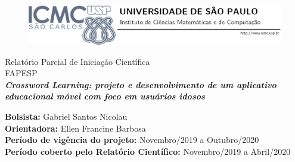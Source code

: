 \begin{titlepage}

\begin{center}
	\begin{figure}[!ht]
	\centering
	\includegraphics[scale=0.5]{Figuras/logo.png}
	\end{figure}
	\vspace{60pt}
	\begin{minipage}[c]{13.5cm}
			\begin{center}
			\vspace{1.3cm} {\Large\sf Relatório Parcial de Iniciação Científica}\\
			\vspace{0.3cm} {\Large\sf FAPESP}\\
			\vspace{5cm}
			\textbf{\Large\sf\textit{Crossword Learning: projeto e desenvolvimento de um
aplicativo educacional móvel com foco em usuários
idosos}}\\
			\vspace{1.3cm}
			\end{center}
		\end{minipage}
\vfill
\begin{minipage}[c]{13.5cm}
	\begin{center}
		\sffamily\textbf{Bolsista:} Gabriel Santos Nicolau\\
		\sffamily\textbf{Orientadora:} Ellen Francine Barbosa\\
		\sffamily\textbf{Período de vigência do projeto:} Novembro/2019 a Outubro/2020\\
		\sffamily\textbf{Período coberto pelo Relatório Científico:} Novembro/2019 a Abril/2020\\
	\end{center}
\end{minipage}
\end{center}
\cleardoublepage
\end{titlepage}